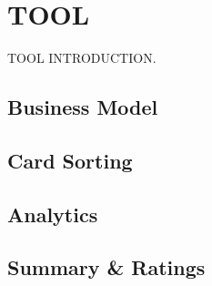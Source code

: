\chapter{TOOL}

\label{chap:tool}


TOOL INTRODUCTION.


\section{Business Model}

\section{Card Sorting}

\section{Analytics}

\section{Summary \& Ratings}